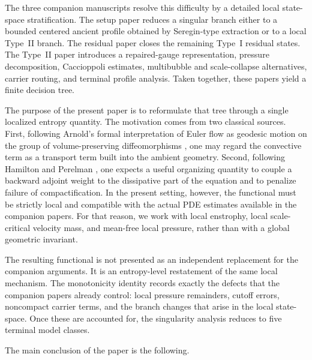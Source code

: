 \documentclass[11pt]{amsart}
\numberwithin{equation}{section}
\theoremstyle{plain}
\theoremstyle{definition}
\theoremstyle{remark}
\begin{document}
The three companion manuscripts
\cite{BallesterSetup,BallesterResidual,BallesterTypeII} resolve this difficulty
by a detailed local state-space stratification.  The setup paper
\cite{BallesterSetup} reduces a singular branch either to a bounded centered
ancient profile obtained by Seregin-type extraction or to a local Type~II
branch.  The residual paper \cite{BallesterResidual} closes the remaining
Type~I residual states.  The Type~II paper \cite{BallesterTypeII} introduces a
repaired-gauge representation, pressure decomposition, Caccioppoli estimates,
multibubble and scale-collapse alternatives, carrier routing, and terminal
profile analysis.  Taken together, these papers yield a finite decision tree.

The purpose of the present paper is to reformulate that tree through a single
localized entropy quantity.  The motivation comes from two classical sources.
First, following Arnold's formal interpretation of Euler flow as geodesic
motion on the group of volume-preserving diffeomorphisms
\cite{Arnold1966,EbinMarsden1970}, one may regard the convective term as a
transport term built into the ambient geometry.  Second, following Hamilton and
Perelman \cite{Hamilton1982,Perelman2002}, one expects a useful organizing
quantity to couple a backward adjoint weight to the dissipative part of the
equation and to penalize failure of compactification.  In the present setting,
however, the functional must be strictly local and compatible with the actual
PDE estimates available in the companion papers.  For that reason, we work with
local enstrophy, local scale-critical velocity mass, and mean-free local
pressure, rather than with a global geometric invariant.

The resulting functional is not presented as an independent replacement for the
companion arguments.  It is an entropy-level restatement of the same local
mechanism.  The monotonicity identity records exactly the defects that the
companion papers already control: local pressure remainders, cutoff errors,
noncompact carrier terms, and the branch changes that arise in the local
state-space.  Once these are accounted for, the singularity analysis reduces to
five terminal model classes.

The main conclusion of the paper is the following.
\end{document}
